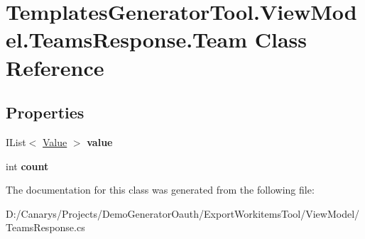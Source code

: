 \hypertarget{class_templates_generator_tool_1_1_view_model_1_1_teams_response_1_1_team}{}\section{Templates\+Generator\+Tool.\+View\+Model.\+Teams\+Response.\+Team Class Reference}
\label{class_templates_generator_tool_1_1_view_model_1_1_teams_response_1_1_team}
\subsection*{Properties}
\begin{DoxyCompactItemize}
\item 
\mbox{\label{class_templates_generator_tool_1_1_view_model_1_1_teams_response_1_1_team_acb59c348a06ea2c60040cce5e242da2e}} 
I\+List$<$ \mbox{\hyperlink{class_templates_generator_tool_1_1_view_model_1_1_teams_response_1_1_value}{Value}} $>$ {\bfseries value}
\item 
\mbox{\label{class_templates_generator_tool_1_1_view_model_1_1_teams_response_1_1_team_a9791ef6d060c878531144c98f4c6a6f3}} 
int {\bfseries count}
\end{DoxyCompactItemize}


The documentation for this class was generated from the following file\+:\begin{DoxyCompactItemize}
\item 
D\+:/\+Canarys/\+Projects/\+Demo\+Generator\+Oauth/\+Export\+Workitems\+Tool/\+View\+Model/Teams\+Response.\+cs\end{DoxyCompactItemize}
